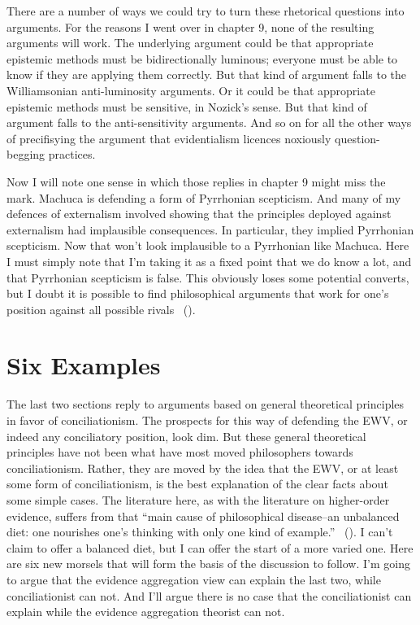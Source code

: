 \documentclass[
  10pt,
  letterpaper,
  twoside]{scrbook}
\begin{document}
There are a number of ways we could try to turn these rhetorical
questions into arguments. For the reasons I went over in chapter 9, none
of the resulting arguments will work. The underlying argument could be
that appropriate epistemic methods must be bidirectionally luminous;
everyone must be able to know if they are applying them correctly. But
that kind of argument falls to the Williamsonian anti-luminosity
arguments. Or it could be that appropriate epistemic methods must be
sensitive, in Nozick's sense. But that kind of argument falls to the
anti-sensitivity arguments. And so on for all the other ways of
precifisying the argument that evidentialism licences noxiously
question-begging practices.

Now I will note one sense in which those replies in chapter 9 might miss
the mark. Machuca is defending a form of Pyrrhonian scepticism. And many
of my defences of externalism involved showing that the principles
deployed against externalism had implausible consequences. In
particular, they implied Pyrrhonian scepticism. Now that won't look
implausible to a Pyrrhonian like Machuca. Here I must simply note that
I'm taking it as a fixed point that we do know a lot, and that
Pyrrhonian scepticism is false. This obviously loses some potential
converts, but I doubt it is possible to find philosophical arguments
that work for one's position against all possible rivals
~().

\section{Six Examples}\label{sixexamples}

The last two sections reply to arguments based on general theoretical
principles in favor of conciliationism. The prospects for this way of
defending the EWV, or indeed any conciliatory position, look dim. But
these general theoretical principles have not been what have most moved
philosophers towards conciliationism. Rather, they are moved by the idea
that the EWV, or at least some form of conciliationism, is the best
explanation of the clear facts about some simple cases. The literature
here, as with the literature on higher-order evidence, suffers from that
``main cause of philosophical disease--an unbalanced diet: one nourishes
one's thinking with only one kind of example.''
~(). I can't
claim to offer a balanced diet, but I can offer the start of a more
varied one. Here are six new morsels that will form the basis of the
discussion to follow. I'm going to argue that the evidence aggregation
view can explain the last two, while conciliationist can not. And I'll
argue there is no case that the conciliationist can explain while the
evidence aggregation theorist can not.
\end{document}
